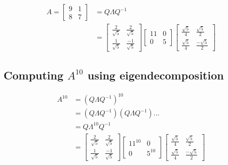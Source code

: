 \documentclass[addpoints]{exam}
\begin{document}
\begin{align*}
	A = \begin{bmatrix} 9 & 1 \\ 8 & 7 \end{bmatrix} &= Q \Lambda Q^{-1}\\
		&= \begin{bmatrix} \frac{2}{\sqrt{5}} & \frac{2}{\sqrt{5}} \\ \frac{1}{\sqrt{5}} & \frac{-1}{\sqrt{5}} \end{bmatrix}
		\begin{bmatrix} 11 & 0 \\ 0 & 5 \end{bmatrix}
		\begin{bmatrix} \frac{\sqrt{5}}{4} & \frac{\sqrt{5}}{2} \\ \frac{\sqrt{5}}{4} & \frac{-\sqrt{5}}{2} \end{bmatrix}
\end{align*}
\subsection{Computing $A^{10}$ using eigendecomposition}
\begin{align*}
	A^{10} &= \left( Q \Lambda Q^{-1} \right)^{10} \\
	&= \left( Q \Lambda Q^{-1} \right) \left( Q \Lambda Q^{-1} \right) ... \\
	&= Q \Lambda^{10} Q^{-1} \\
	&= \begin{bmatrix} \frac{2}{\sqrt{5}} & \frac{2}{\sqrt{5}} \\ \frac{1}{\sqrt{5}} & \frac{-1}{\sqrt{5}} \end{bmatrix}
	\begin{bmatrix} 11^{10} & 0 \\ 0 & 5^{10} \end{bmatrix}
	\begin{bmatrix} \frac{\sqrt{5}}{4} & \frac{\sqrt{5}}{2} \\ \frac{\sqrt{5}}{4} & \frac{-\sqrt{5}}{2} \end{bmatrix}
\end{align*}
\end{document}
